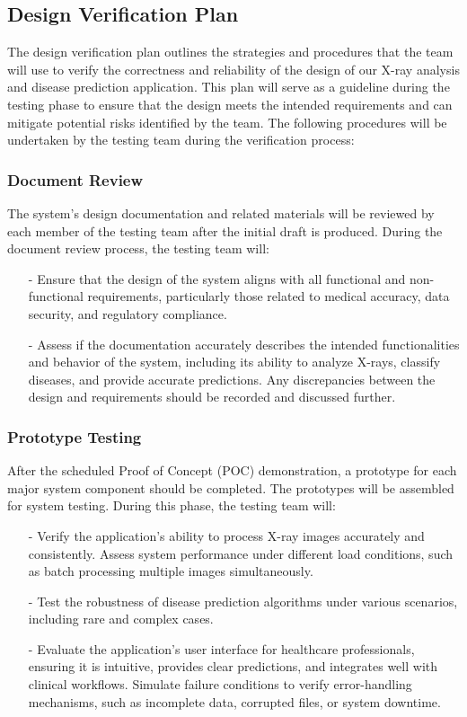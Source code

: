 \documentclass[12pt, titlepage]{article}
\begin{document}
\subsection{Design Verification Plan}

The design verification plan outlines the strategies and procedures that the team will use to verify the correctness and reliability of the design of our X-ray analysis and disease prediction application. This plan will serve as a guideline during the testing phase to ensure that the design meets the intended requirements and can mitigate potential risks identified by the team. The following procedures will be undertaken by the testing team during the verification process:

\subsubsection{Document Review}
The system's design documentation and related materials will be reviewed by each member of the testing team after the initial draft is produced. During the document review process, the testing team will:
\begin{itemize}
\item[-] Ensure that the design of the system aligns with all functional and non-functional requirements, particularly those related to medical accuracy, data security, and regulatory compliance.
\item[-] Assess if the documentation accurately describes the intended functionalities and behavior of the system, including its ability to analyze X-rays, classify diseases, and provide accurate predictions. Any discrepancies between the design and requirements should be recorded and discussed further.
\end{itemize}

\subsubsection{Prototype Testing}
After the scheduled Proof of Concept (POC) demonstration, a prototype for each major system component should be completed. The prototypes will be assembled for system testing. During this phase, the testing team will:
\begin{itemize}
\item[-] Verify the application’s ability to process X-ray images accurately and consistently.
Assess system performance under different load conditions, such as batch processing multiple images simultaneously.
\item[-] Test the robustness of disease prediction algorithms under various scenarios, including rare and complex cases.
\item[-] Evaluate the application's user interface for healthcare professionals, ensuring it is intuitive, provides clear predictions, and integrates well with clinical workflows.
Simulate failure conditions to verify error-handling mechanisms, such as incomplete data, corrupted files, or system downtime.
\end{itemize}
\end{document}
